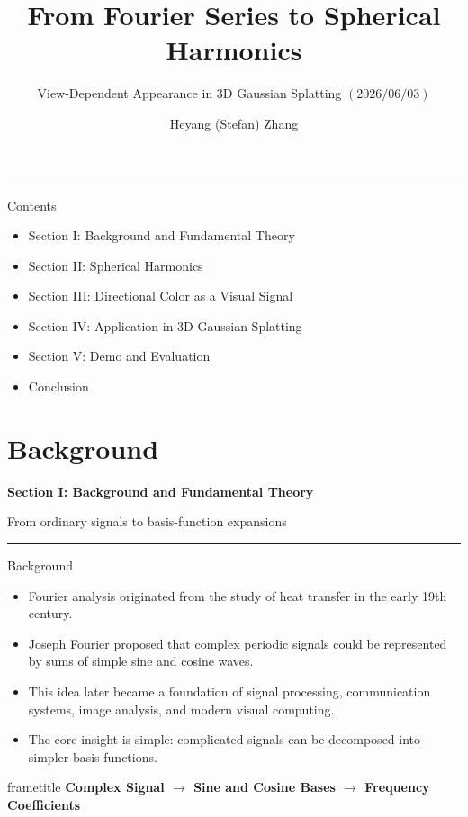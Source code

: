 \documentclass[aspectratio=169,10pt]{beamer}
\title{From Fourier Series to Spherical Harmonics}
\subtitle{View-Dependent Appearance in 3D Gaussian Splatting $\left( 2026/06/03 \right)$}
\author{Heyang (Stefan) Zhang}
\institute{Sichuan University - Pittsburgh Institute}
\date{}
\newcommand{\pipelinebox}[1]{
  \begin{beamercolorbox}[wd=\linewidth,sep=0.8em,rounded=true,center]{frametitle}
    \color{SCUGreen}\bfseries #1
  \end{beamercolorbox}
}
\newcommand{\sectiondivider}[2]{
  \begin{frame}[plain]
    \vspace{1.75cm}
    {\color{SCUGreen}\bfseries\fontsize{15.2}{18}\selectfont #1\par}
    \vspace{0.42cm}
    {\color{SCUGreen}\fontsize{13.2}{15.6}\selectfont #2\par}
    \vspace{0.28cm}
    {\color{SCUGreen}\rule{0.92\linewidth}{0.55pt}\par}
    \vfill
  \end{frame}
}
\begin{document}
\begin{frame}[plain]
  \vspace{1.55cm}
  {\color{SCUGreen}\bfseries\fontsize{15.2}{18}\selectfont \inserttitle\par}
  \vspace{0.42cm}
  {\color{SCUGreen}\fontsize{13.2}{15.6}\selectfont \insertsubtitle\par}
  \vspace{0.28cm}
  {\color{SCUGreen}\rule{0.96\linewidth}{0.55pt}\par}
  \vfill
  {\centering\fontsize{11.8}{14}\selectfont \insertauthor\par}
  \vspace{0.75cm}
  {\centering\fontsize{11}{13}\selectfont \insertinstitute\par}
  \vspace{1.15cm}
\end{frame}

\begin{frame}[t]{Contents}
  \large
  \vspace{1.5cm}
  \begin{itemize}
    \item Section I: Background and Fundamental Theory
    \item Section II:  Spherical Harmonics
    \item Section III: Directional Color as a Visual Signal
    \item Section IV: Application in 3D Gaussian Splatting
    \item Section V: Demo and Evaluation
    \item Conclusion
  \end{itemize}
\end{frame}

\section{Background}
\sectiondivider{Section I: Background and Fundamental Theory}{From ordinary signals to basis-function expansions}

\begin{frame}[t]{Background}
  \justifying
\begin{itemize}
  \item Fourier analysis originated from the study of heat transfer in the early 19th century.
  \item Joseph Fourier proposed that complex periodic signals could be represented by sums of simple sine and cosine waves.
  \item This idea later became a foundation of signal processing, communication systems, image analysis, and modern visual computing.
  \item The core insight is simple: complicated signals can be decomposed into simpler basis functions.
\end{itemize}

  \vspace{6.75em}
  \pipelinebox{Complex Signal $\rightarrow$ Sine and Cosine Bases $\rightarrow$ Frequency Coefficients}
\end{frame}
\end{document}
